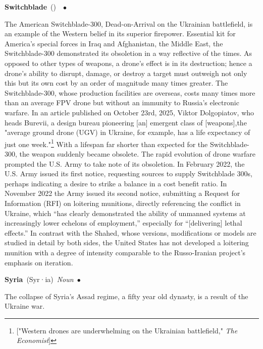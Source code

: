 \documentclass[10pt,a4paper,twoside]{article} %
\newcommand{\entry}[4]{\markboth{#1}{#1}\textbf{#1}\ {(#2)}\ \textit{#3}\ $\bullet$\ {#4}}  %
\begin{document}
\begin{multicols}{2}
\entry{Switchblade} {} {} {The American Switchblade-300, Dead-on-Arrival on the Ukrainian battlefield, is an example of the Western belief in its superior firepower. Essential kit for America's special forces in Iraq and Afghanistan, the Middle East, the Switchblade-300 demonstrated its obsoletion in a way reflective of the times. As opposed to other types of weapons, a drone's effect is in its destruction; hence a drone's ability to disrupt, damage, or destroy a target must outweigh not only this but its own cost by an order of magnitude many times greater. The Switchblade-300, whose production facilities are overseas, costs many times more than an average FPV drone but without an immunity to Russia's electronic warfare. In an article published on October 23rd, 2025, Viktor Dolgopiatov, who heads Burevii, a design bureau pioneering [an] emergent class of [weapons],the "average ground drone (UGV) in Ukraine, for example, has a life expectancy of just one week."\footnote{["Western drones are underwhelming on the Ukrainian battlefield," \emph{The Economist}]} With a lifespan far shorter than expected for the Switchblade-300, the weapon suddenly became obsolete. \newline \indent The rapid evolution of drone warfare prompted the U.S. Army to take note of its obsoletion. In February 2022, the U.S. Army issued its first notice, requesting sources to supply Switchblade 300s, perhaps indicating a desire to strike a balance in a cost benefit ratio. In November 2022 the Army issued its second notice, submitting a Request for Information (RFI) on loitering munitions, directly referencing the conflict in Ukraine, which “has clearly demonstrated the ability of unmanned systems at increasingly lower echelons of employment,” especially for “[delivering] lethal effects.” \newline \indent In contrast with the Shahed, whose versions, modifications or models are studied in detail by both sides, the United States has not developed a loitering munition with a degree of intensity comparable to the Russo-Iranian project's emphasis on iteration. 

}

\entry{Syria} {Syr·ia} {Noun} {
The collapse of Syria's Assad regime, a fifty year old dynasty, is a result of the Ukraine war. 

}


\end{multicols}


\end{document}

